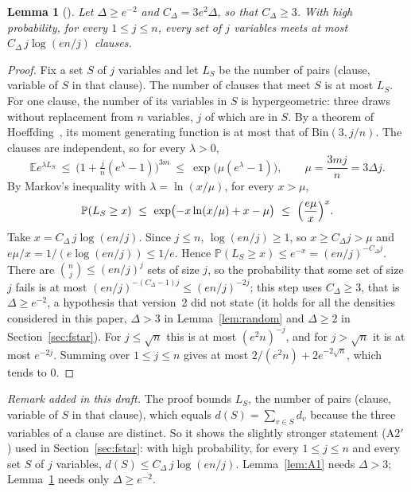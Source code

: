 \documentclass[11pt,a4paper]{article}
\newtheorem{lemma}[theorem]{Lemma}
\theoremstyle{definition}
\theoremstyle{remark}
\newcommand{\E}{\mathbb{E}}
\newcommand{\PP}{\mathbb{P}}
\begin{document}
\begin{lemma}[{\cite[Lemma~A.2]{DL}}]\label{lem:A2}
Let $\Delta\ge e^{-2}$ and $C_\Delta=3e^2\Delta$, so that $C_\Delta\ge3$. With high probability, for every $1\le j\le n$, every set of $j$
variables meets at most $C_\Delta\,j\log(en/j)$ clauses.
\end{lemma}

\begin{proof}
Fix a set $S$ of $j$ variables and let $L_S$ be the number of pairs (clause, variable of $S$
in that clause). The number of clauses that meet $S$ is at most $L_S$. For one clause, the
number of its variables in $S$ is hypergeometric: three draws without replacement from $n$
variables, $j$ of which are in $S$. By a theorem of Hoeffding~\cite[Theorem~4]{Hoe63}, its
moment generating function is at most that of $\mathrm{Bin}(3,j/n)$. The clauses are
independent, so for every $\lambda>0$,
\[
\E e^{\lambda L_S}\ \le\ \bigl(1+\tfrac jn(e^\lambda-1)\bigr)^{3m}\ \le\ \exp\bigl(\mu(e^\lambda-1)\bigr),
\qquad \mu=\frac{3mj}{n}=3\Delta j .
\]
By Markov's inequality with $\lambda=\ln(x/\mu)$, for every $x>\mu$,
\[
\PP(L_S\ge x)\ \le\ \exp\bigl(-x\ln(x/\mu)+x-\mu\bigr)\ \le\ \Bigl(\frac{e\mu}{x}\Bigr)^{x}.
\]
Take $x=C_\Delta\,j\log(en/j)$. Since $j\le n$, $\log(en/j)\ge1$, so $x\ge C_\Delta j>\mu$ and
$e\mu/x=1/(e\log(en/j))\le1/e$. Hence
$\PP(L_S\ge x)\le e^{-x}=(en/j)^{-C_\Delta j}$. There are $\binom nj\le(en/j)^j$ sets of size
$j$, so the probability that some set of size $j$ fails is at most
$(en/j)^{-(C_\Delta-1)j}\le(en/j)^{-2j}$; this step uses $C_\Delta\ge3$, that is
$\Delta\ge e^{-2}$, a hypothesis that version~2 did not state (it holds for all the
densities considered in this paper, $\Delta>3$ in Lemma~\ref{lem:random} and $\Delta\ge2$ in
Section~\ref{sec:fstar}). For $j\le\sqrt n$ this is at most $(e^2n)^{-j}$, and
for $j>\sqrt n$ it is at most $e^{-2j}$. Summing over $1\le j\le n$ gives at most
$2/(e^2n)+2e^{-2\sqrt n}$, which tends to $0$.
\end{proof}

\noindent\emph{Remark added in this draft.} The proof bounds $L_S$, the number of pairs
(clause, variable of $S$ in that clause), which equals $d(S)=\sum_{v\in S}d_v$ because the
three variables of a clause are distinct. So it shows the slightly stronger statement
(A2$'$) used in Section~\ref{sec:fstar}: with high probability, for every $1\le j\le n$ and
every set $S$ of $j$ variables, $d(S)\le C_\Delta\,j\log(en/j)$. Lemma~\ref{lem:A1} needs
$\Delta>3$; Lemma~\ref{lem:A2} needs only $\Delta\ge e^{-2}$.
\end{document}
